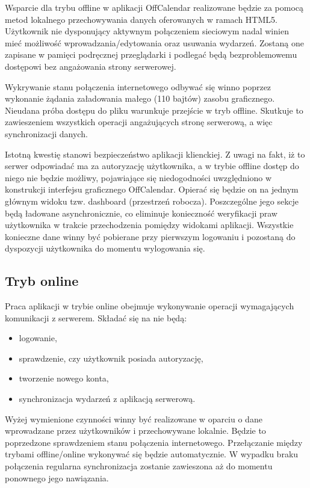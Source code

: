 Wsparcie dla trybu offline w aplikacji OffCalendar realizowane będzie za pomocą metod lokalnego przechowywania danych oferowanych w ramach HTML5. Użytkownik nie dysponujący aktywnym połączeniem sieciowym nadal winien mieć możliwość wprowadzania/edytowania oraz usuwania wydarzeń. Zostaną one zapisane w pamięci podręcznej przeglądarki i podlegać będą bezproblemowemu dostępowi bez angażowania strony serwerowej.

Wykrywanie stanu połączenia internetowego odbywać się winno poprzez wykonanie żądania załadowania małego (110 bajtów) zasobu graficznego. Nieudana próba dostępu do pliku warunkuje przejście w tryb offline. Skutkuje to zawieszeniem wszystkich operacji angażujących stronę serwerową, a więc synchronizacji danych.
	
Istotną kwestię stanowi bezpieczeństwo aplikacji klienckiej. Z uwagi na fakt, iż to serwer odpowiadać ma za autoryzację użytkownika, a w trybie offline dostęp do niego nie będzie możliwy, pojawiające się niedogodności uwzględniono w konstrukcji interfejsu graficznego OffCalendar. Opierać się będzie on na jednym głównym widoku tzw. dashboard (przestrzeń robocza). Poszczególne jego sekcje będą ładowane asynchronicznie, co eliminuje konieczność weryfikacji praw użytkownika w trakcie przechodzenia pomiędzy widokami aplikacji. Wszystkie konieczne dane winny być pobierane przy pierwszym logowaniu i pozostaną do dyspozycji użytkownika do momentu wylogowania się.

\subsection{Tryb online}
\label{trybOn}

Praca aplikacji w trybie online obejmuje wykonywanie operacji wymagających komunikacji z serwerem. Składać się na nie będą:

\begin{itemize}
\item logowanie,
\item sprawdzenie, czy użytkownik posiada autoryzację,
\item tworzenie nowego konta,
\item synchronizacja wydarzeń z aplikacją serwerową.
\end{itemize}

Wyżej wymienione czynności winny być realizowane w oparciu o dane wprowadzane przez użytkowników i przechowywane lokalnie. Będzie to poprzedzone sprawdzeniem stanu połączenia internetowego. Przełączanie między trybami offline/online wykonywać się będzie automatycznie. W wypadku braku połączenia regularna synchronizacja zostanie zawieszona aż do momentu ponownego jego nawiązania.

